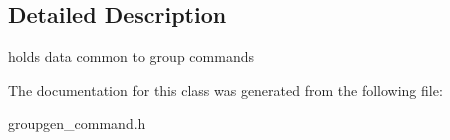 \subsection{Detailed Description}
holds data common to group commands 

The documentation for this class was generated from the following file\-:\begin{DoxyCompactItemize}
\item 
groupgen\-\_\-command.\-h\end{DoxyCompactItemize}

